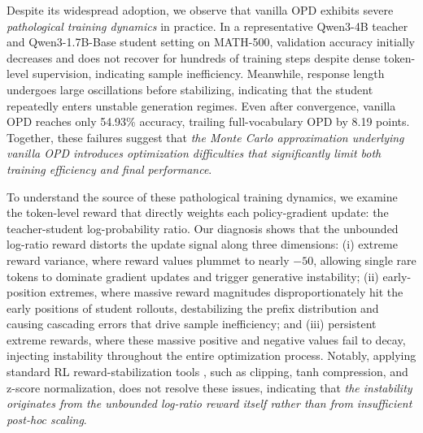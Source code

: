 Despite its widespread adoption, we observe that vanilla OPD exhibits severe \emph{pathological training dynamics} in practice. In a representative Qwen3-4B teacher and Qwen3-1.7B-Base student setting on \textsc{MATH-500}, validation accuracy initially decreases and does not recover for hundreds of training steps despite dense token-level supervision, indicating sample inefficiency. Meanwhile, response length undergoes large oscillations before stabilizing, indicating that the student repeatedly enters unstable generation regimes. Even after convergence, vanilla OPD reaches only 54.93\% accuracy, trailing full-vocabulary OPD by 8.19 points. Together, these failures suggest that \emph{the Monte Carlo approximation underlying vanilla OPD introduces optimization difficulties that significantly limit both training efficiency and final performance}.

To understand the source of these pathological training dynamics, we examine the token-level reward that directly weights each policy-gradient update: the teacher-student log-probability ratio. Our diagnosis shows that the unbounded log-ratio reward distorts the update signal along three dimensions:
(i) extreme reward variance, where reward values plummet to nearly $-50$, allowing single rare tokens to dominate gradient updates and trigger generative instability; (ii) early-position extremes, where massive reward magnitudes disproportionately hit the early positions of student rollouts, destabilizing the prefix distribution and causing cascading errors that drive sample inefficiency; and (iii) persistent extreme rewards, where these massive positive and negative values fail to decay, injecting instability throughout the entire optimization process. Notably, applying standard RL reward-stabilization tools \citep{mnih2015human,schulman2017ppo}, such as clipping, tanh compression, and z-score normalization, does not resolve these issues, indicating that \textit{the instability originates from the unbounded log-ratio reward itself rather than from insufficient post-hoc scaling}.

